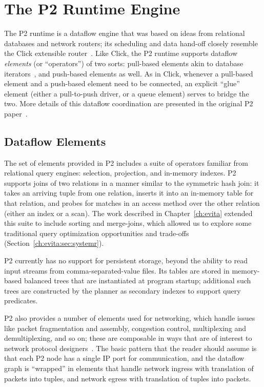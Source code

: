 \section{The P2 Runtime Engine}
\label{ch:p2:sec:p2}

The P2 runtime is a dataflow engine that was based on ideas from relational databases and network 
routers; its scheduling and data hand-off closely resemble the Click extensible router~\cite{click-tocs}.  
Like Click, the P2 runtime supports dataflow {\em elements} (or ``operators'') of two sorts: pull-based 
elements akin to database iterators~\cite{graefe-survey}, and push-based elements as well.  As in Click, 
whenever a pull-based element and a push-based element need to be connected, an explicit ``glue'' 
element (either a pull-to-push driver, or a queue element) serves to bridge the two.  More details of this 
dataflow coordination are presented in the original P2 paper~\cite{p2:sosp}.

\subsection{Dataflow Elements}
The set of elements provided in P2 includes a suite of operators familiar from relational query engines: 
selection, projection, and in-memory indexes.  P2 supports joins of two relations in a manner similar to 
the symmetric hash join: it takes an arriving tuple from one relation, inserts it into an in-memory table for 
that relation, and probes for matches in an access method over the other relation (either an index or a scan).  
The work described in Chapter~\ref{ch:evita} extended this suite to include sorting and merge-joins, which 
allowed us to explore some traditional query optimization opportunities and trade-offs (Section~\ref{ch:evita:sec:systemr}).

P2 currently has no support for persistent storage, beyond the ability to read input streams from comma-separated-value 
files.  Its tables are stored in memory-based balanced trees that are instantiated at program startup; additional such 
trees are constructed by the planner as secondary indexes to support query predicates.

P2 also provides a number of elements used for networking, which handle issues like packet fragmentation 
and assembly, congestion control, multiplexing and demultiplexing, and so on; these are composable in ways 
that are of interest to network protocol designers~\cite{condie-hotnets05}. The basic pattern that the reader 
should assume is that each P2 node has a single IP port for communication, and the dataflow graph is ``wrapped'' 
in elements that handle network ingress with translation of packets into tuples, and network egress with 
translation of tuples into packets.

